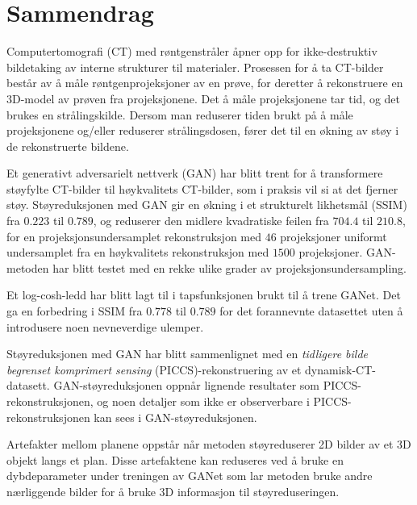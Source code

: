 \chapter*{Sammendrag}
Computertomografi (CT) med røntgenstråler åpner opp for ikke-destruktiv bildetaking av interne strukturer til materialer. Prosessen for å ta CT-bilder består av å måle røntgenprojeksjoner av en prøve, for deretter å rekonstruere en 3D-model av prøven fra projeksjonene. Det å måle projeksjonene tar tid, og det brukes en strålingskilde. Dersom man reduserer tiden brukt på å måle projeksjonene og/eller reduserer strålingsdosen, fører det til en økning av støy i de rekonstruerte bildene.

Et generativt adversarielt nettverk (GAN) har blitt trent for å transformere støyfylte CT-bilder til høykvalitets CT-bilder, som i praksis vil si at det fjerner støy. Støyreduksjonen med GAN gir en økning i et strukturelt likhetsmål (SSIM) fra $0.223$ til $0.789$, og reduserer den midlere kvadratiske feilen fra $704.4$ til $210.8$, for en projeksjonsundersamplet rekonstruksjon med $46$ projeksjoner uniformt undersamplet fra en høykvalitets rekonstruksjon med $1500$ projeksjoner. GAN-metoden har blitt testet med en rekke ulike grader av projeksjonsundersampling. 

Et log-cosh-ledd har blitt lagt til i tapsfunksjonen brukt til å trene GANet. Det ga en forbedring i SSIM fra $0.778$ til $0.789$ for det forannevnte datasettet uten å introdusere noen nevneverdige ulemper. 

Støyreduksjonen med GAN har blitt sammenlignet med en \textit{tidligere bilde begrenset komprimert sensing} (PICCS)-rekonstruering av et dynamisk-CT-datasett. GAN-støyreduksjonen oppnår lignende resultater som PICCS-rekonstruksjonen, og noen detaljer som ikke er observerbare i PICCS-rekonstruksjonen kan sees i GAN-støyreduksjonen. 

Artefakter mellom planene oppstår når metoden støyreduserer 2D bilder av et 3D objekt langs et plan. Disse artefaktene kan reduseres ved å bruke en dybdeparameter under treningen av GANet som lar metoden bruke andre nærliggende bilder for å bruke 3D informasjon til støyreduseringen. 
